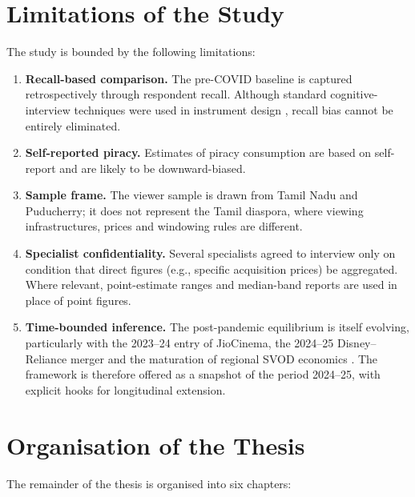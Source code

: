 \section{Limitations of the Study}
\label{sec:limitations}

The study is bounded by the following limitations:

\begin{enumerate}[itemsep=2pt]
  \item \textbf{Recall-based comparison.}  The pre-COVID baseline
        is captured retrospectively through respondent recall.
        Although standard cognitive-interview techniques were used
        in instrument design \citep{tourangeau2000}, recall bias
        cannot be entirely eliminated.
  \item \textbf{Self-reported piracy.}  Estimates of piracy
        consumption are based on self-report and are likely to be
        downward-biased.
  \item \textbf{Sample frame.}  The viewer sample is drawn from
        Tamil Nadu and Puducherry; it does not represent the Tamil
        diaspora, where viewing infrastructures, prices and
        windowing rules are different.
  \item \textbf{Specialist confidentiality.}  Several specialists
        agreed to interview only on condition that direct figures
        (e.g., specific acquisition prices) be aggregated.  Where
        relevant, point-estimate ranges and median-band reports
        are used in place of point figures.
  \item \textbf{Time-bounded inference.}  The post-pandemic
        equilibrium is itself evolving, particularly with the
        2023--24 entry of JioCinema, the 2024--25 Disney--Reliance
        merger and the maturation of regional SVOD economics
        \citep{economictimes2024jiomerger,thehindu2024merger}.  The
        framework is therefore offered as a snapshot of the period
        2024--25, with explicit hooks for longitudinal extension.
\end{enumerate}

\section{Organisation of the Thesis}
\label{sec:organisation}

The remainder of the thesis is organised into six chapters:

